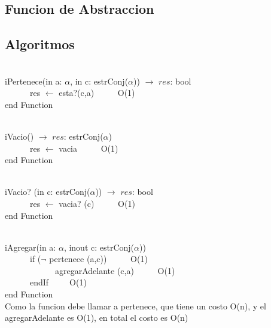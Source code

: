 \documentclass[a4paper,10pt]{article}
\begin{document}
\subsection{Funcion de Abstraccion}

\subsection{Algoritmos}

\begin{algoritmo}
\caption{}\\
  iPertenece(in a: $\alpha$, in c: estrConj($\alpha$)) $\rightarrow$ $res$: bool \\
	\indent \ \ \ \ \ \  res $\gets$ esta?(c,a)  \ \ \ \ \ O(1)\\
   end Function 
\end{algoritmo}

\begin{algoritmo}
\caption{}\\
  iVacio() $\rightarrow$ $res$: estrConj($\alpha$) \\
	\indent \ \ \ \ \ \  res $\gets$ vacia  \ \ \ \ \ O(1)\\
   end Function 
\end{algoritmo}

\begin{algoritmo}
\caption{}\\
  iVacio? (in c: estrConj($\alpha$)) $\rightarrow$ $res$: bool \\
	\indent \ \ \ \ \ \  res $\gets$ vacia? (c)  \ \ \ \ \ O(1)\\
   end Function 
\end{algoritmo}

\begin{algoritmo}
\caption{}\\
  iAgregar(in a: $\alpha$, inout c: estrConj($\alpha$)) \\
	\indent \ \ \ \ \ \  if ($\neg$ pertenece (a,c))  \ \ \ \ \ O(1)\\
	\indent \ \ \ \ \ \ \ \ \ \ \ \  agregarAdelante (c,a)  \ \ \ \ \ O(1)\\
	\indent \ \ \ \ \ \  endIf\ \ \ \ \ O(1)\\
   end Function \\

   Como la funcion debe llamar a pertenece, que tiene un costo O(n), y el agregarAdelante es O(1), en total el costo es O(n)
\end{algoritmo}
\end{document}
